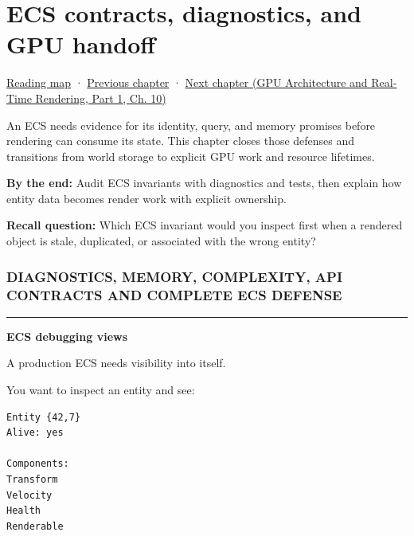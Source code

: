 \chapter{ECS contracts, diagnostics, and GPU handoff}\label{05-engine-i-ch018-ecs-contracts-diagnostics-and-gpu-handoff}\hypertarget{05-engine-i-ch018}{}\label{stagechapter:05-engine-i-ch018}

\hypertarget{05-engine-i-ch018-ecs-contracts-diagnostics-and-gpu-handoff}{}

\hyperref[volume-reading-map]{Reading map} · \hyperref[05-engine-i-ch017-ecs-performance-through-cache-and-scheduling]{Previous chapter} · \href{../06-GPU-Architecture-and-Real-Time-Rendering-P01/main.pdf\#nameddest=05-engine-i-ch019-gpu-work-and-reusable-metal-frames}{Next chapter (GPU Architecture and Real-Time Rendering, Part 1, Ch. 10)}

An ECS needs evidence for its identity, query, and memory promises before rendering can consume its state. This chapter closes those defenses and transitions from world storage to explicit GPU work and resource lifetimes.

\textbf{By the end:} Audit ECS invariants with diagnostics and tests, then explain how entity data becomes render work with explicit ownership.

\textbf{Recall question:} Which ECS invariant would you inspect first when a rendered object is stale, duplicated, or associated with the wrong entity?

\subsection{DIAGNOSTICS, MEMORY, COMPLEXITY, API CONTRACTS AND COMPLETE ECS DEFENSE}\label{05-engine-i-ch018-diagnostics-memory-complexity-api-contracts-and-complete-ecs-defense}

\hypertarget{05-engine-i-ch018-diagnostics-memory-complexity-api-contracts-and-complete-ecs-defense}{}

\begin{center}\rule{0.5\linewidth}{0.5pt}\end{center}

\textbf{ECS debugging views}

A production ECS needs visibility into itself.

You want to inspect an entity and see:

\begin{verbatim}
Entity {42,7}
Alive: yes

Components:
Transform
Velocity
Health
Renderable
\end{verbatim}

